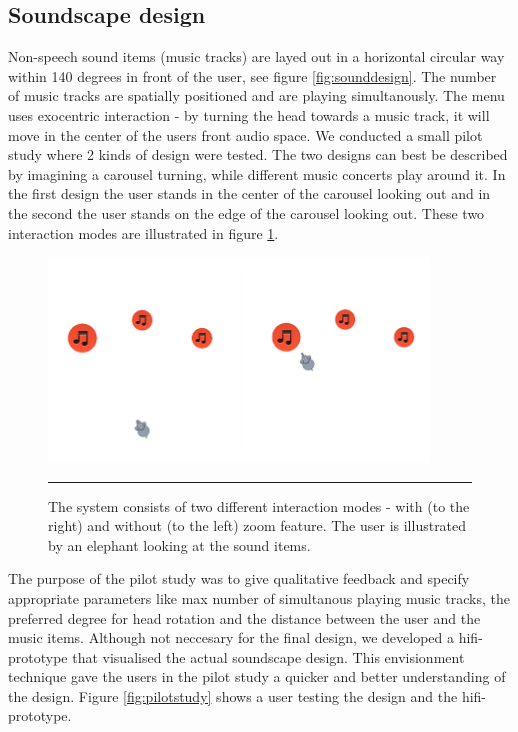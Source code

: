 \subsection{Soundscape design}
Non-speech sound items (music tracks) are layed out in a horizontal circular way within 140 degrees in front of the user, see figure \ref{fig:sounddesign}. The number of music tracks are spatially positioned and are playing simultanously. The menu uses exocentric interaction - by turning the head towards a music track, it will move in the center of the users front audio space. We conducted a small pilot study where 2 kinds of design were tested. The two designs can best be described by imagining a carousel turning, while different music concerts play around it. In the first design the user stands in the center of the carousel looking out and in the second the user stands on the edge of the carousel looking out. These two interaction modes are illustrated in figure \ref{fig:interactionmodes}.

\begin{figure}[t]
	\centering
		\includegraphics[width=0.9\textwidth,height=\textheight,keepaspectratio]{./Figures/interactionmodes.png}
		\rule{35em}{0.5pt}
	\caption[Interaction modes]{The system consists of two different interaction modes - with (to the right) and without (to the left) zoom feature. The user is illustrated by an elephant looking at the sound items.}
	\label{fig:interactionmodes}
\end{figure}

The purpose of the pilot study was to give qualitative feedback and specify appropriate parameters like max number of simultanous playing music tracks, the preferred degree for head rotation and the distance between the user and the music items. Although not neccesary for the final design, we developed a hifi-prototype \cite{benyon_designing_2010} that visualised the actual soundscape design. This envisionment technique gave the users in the pilot study a quicker and better understanding of the design. Figure \ref{fig:pilotstudy} shows a user testing the design and the hifi-prototype.

